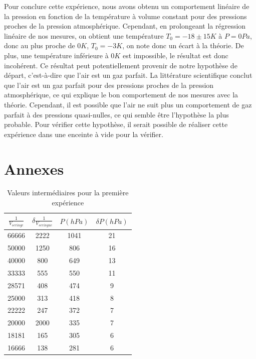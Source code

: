 \documentclass[12pt]{article}
\begin{document}
\newpage
Pour conclure cette expérience, nous avons obtenu un comportement linéaire de la pression en fonction de la température à volume constant pour des pressions proches de la pression atmosphérique.
Cependant, en prolongeant la régression linéaire de nos mesures, on obtient une température $T_0 = -18 \pm 15 K$ à $P=0Pa$, donc au plus proche de $0K$, $T_0 = -3K$, on note donc un écart à la théorie.
De plus, une température inférieure à $0K$ est impossible, le résultat est donc incohérent. Ce résultat peut potentiellement provenir de notre hypothèse de départ, c'est-à-dire que l'air est un gaz parfait. 
La littérature scientifique conclut que l'air est un gaz parfait pour des pressions proches de la pression atmosphérique, ce qui explique le bon comportement
de nos mesures avec la théorie. Cependant, il est possible que l'air ne suit plus un comportement de gaz parfait à des pressions quasi-nulles, ce qui semble être l'hypothèse la plus probable. 
Pour vérifier cette hypothèse, il serait possible de réaliser cette expérience dans une enceinte à vide pour la vérifier. 

\newpage
\section*{Annexes}
\begin{table}[h!]
\begin{center}
\begin{tabular}{|c|c|c|c|}
\hline
         $\frac{1}{V_{seringe}}$ &    $\delta \frac{1}{V_{seringue}}$ &  $P(hPa)$ &  $\delta P(hPa)$ \\
\hline
66666 & 2222 &                    1041 &           21 \\
50000 & 1250 &                     806 &           16 \\
40000 &  800 &                     649 &           13 \\
33333 &  555 &                     550 &           11 \\
28571 &  408 &                     474 &            9 \\
25000 &  313 &                     418 &            8 \\
22222 &  247 &                     372 &            7 \\
20000 &  2000 &                     335 &            7 \\
18181 &  165 &                     305 &            6 \\
16666 &  138 &                     281 &            6 \\
\hline
\end{tabular}
\end{center}
\label{Table1annexes}
\caption{Valeurs intermédiaires pour la première expérience}
\end{table}
\end{document}
